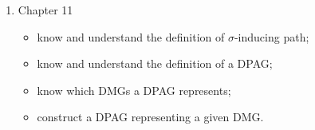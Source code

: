 \begin{enumerate}
\begin{itemize}
      \item understand under which conditions the $G$ test is valid (at level $\alpha$);
      \item understand under which conditions the $G$ test is asymptotically consistent;
      \item implement the $G$ test in a computer program;
    \end{itemize}
  \item Chapter 11
    \begin{itemize}
      \item know and understand the definition of $\sigma$-inducing path;
      \item know and understand the definition of a DPAG;
      \item know which DMGs a DPAG represents;
      \item construct a DPAG representing a given DMG.
    \end{itemize}
\end{enumerate}
